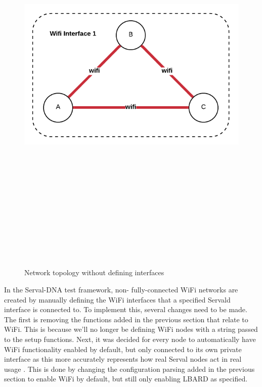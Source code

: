 \begin{figure}
    \begin{centering}
        \includegraphics[width=14cm,height=20cm,keepaspectratio]{Figures/networkWifiInterface1.png}
        \caption{Network topology without defining interfaces}
        \label{fig:networkWifi1}
    \end{centering}
\end{figure}

In the Serval-DNA test framework, non- fully-connected WiFi networks are created by manually defining the WiFi interfaces that a specified Servald interface is connected to.
To implement this, several changes need to be made.
The first is removing the functions added in the previous section that relate to WiFi.
This is because we'll no longer be defining WiFi nodes with a string passed to the setup functions.
Next, it was decided for every node to automatically have WiFi functionality enabled by default, but only connected to its own private interface as this more accurately represents how real Serval nodes act in real usage .
This is done by changing the configuration parsing added in the previous section to enable WiFi by default, but still only enabling LBARD as specified.

